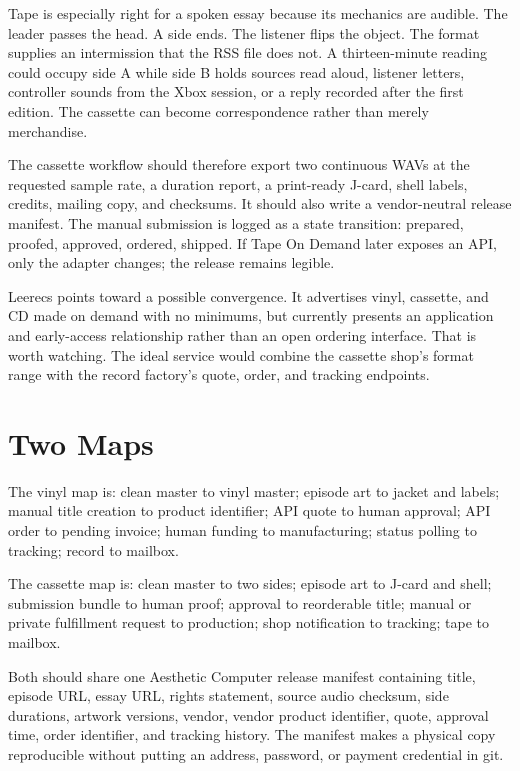 \documentclass[11pt,letterpaper]{article}
\begin{document}
Tape is especially right for a spoken essay because its mechanics are audible. The leader passes the head. A side ends. The listener flips the object. The format supplies an intermission that the RSS file does not. A thirteen-minute reading could occupy side A while side B holds sources read aloud, listener letters, controller sounds from the Xbox session, or a reply recorded after the first edition. The cassette can become correspondence rather than merely merchandise.

The cassette workflow should therefore export two continuous WAVs at the requested sample rate, a duration report, a print-ready J-card, shell labels, credits, mailing copy, and checksums. It should also write a vendor-neutral release manifest. The manual submission is logged as a state transition: prepared, proofed, approved, ordered, shipped. If Tape On Demand later exposes an API, only the adapter changes; the release remains legible.

Leerecs points toward a possible convergence. It advertises vinyl, cassette, and CD made on demand with no minimums, but currently presents an application and early-access relationship rather than an open ordering interface. That is worth watching. The ideal service would combine the cassette shop's format range with the record factory's quote, order, and tracking endpoints.

\section{Two Maps}

The vinyl map is: clean master to vinyl master; episode art to jacket and labels; manual title creation to product identifier; API quote to human approval; API order to pending invoice; human funding to manufacturing; status polling to tracking; record to mailbox.

The cassette map is: clean master to two sides; episode art to J-card and shell; submission bundle to human proof; approval to reorderable title; manual or private fulfillment request to production; shop notification to tracking; tape to mailbox.

Both should share one Aesthetic Computer release manifest containing title, episode URL, essay URL, rights statement, source audio checksum, side durations, artwork versions, vendor, vendor product identifier, quote, approval time, order identifier, and tracking history. The manifest makes a physical copy reproducible without putting an address, password, or payment credential in git.
\end{document}
